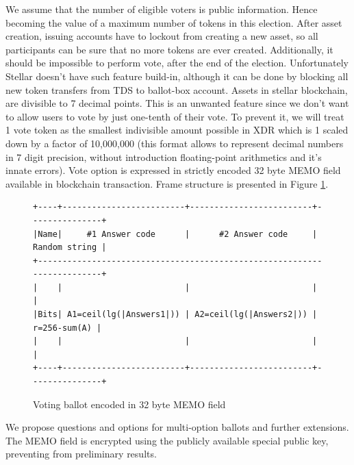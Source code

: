 \documentclass[runningheads]{llncs}
\begin{document}
We assume that the number of eligible voters is public information. Hence becoming the value of a maximum number of tokens in this election. After asset creation, issuing accounts have to lockout from creating a new asset, so all participants can be sure that no more tokens are ever created. Additionally, it should be impossible to perform vote, after the end of the election. Unfortunately Stellar doesn’t have such feature build-in, although it can be done by blocking all new token transfers from TDS to ballot-box account.
Assets in stellar blockchain, are divisible to 7 decimal points. This is an unwanted feature since we don’t want to allow users to vote by just one-tenth of their vote. To prevent it, we will treat 1 vote token as the smallest indivisible amount possible in XDR which is 1 scaled down by a factor of 10,000,000 (this format allows to represent decimal numbers in 7 digit precision, without introduction floating-point arithmetics and it’s innate errors).
Vote option is expressed in strictly encoded 32 byte MEMO field available in blockchain transaction. Frame structure is presented in Figure \ref{fig:ballot-encoding}. 



\begin{figure}
\begin{verbatim}
+----+-------------------------+-------------------------+---------------+
|Name|     #1 Answer code      |      #2 Answer code     | Random string |
+------------------------------------------------------------------------+
|    |                         |                         |               |
|Bits| A1=ceil(lg(|Answers1|)) | A2=ceil(lg(|Answers2|)) |  r=256-sum(A) |
|    |                         |                         |               |
+----+-------------------------+-------------------------+---------------+

\end{verbatim}
\caption{Voting ballot encoded in 32 byte MEMO field}
\label{fig:ballot-encoding}
\end{figure} 

We propose questions and options for multi-option ballots and further extensions.
The MEMO field is encrypted using the publicly available special public key,
preventing from preliminary results. %
\end{document}
